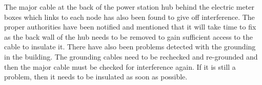\documentclass[a4paper,12pt]{article}
\begin{document}
                                                                                                                                                                                                                                                                                                                                                                                                                                                                                                                                                                                                                                                                                                                                                                                                                                                                                                                                                                                                                                                                                                                                                                                                                                                                                                                                                                                                                                                                     The major cable at the back of the power station hub behind the electric meter boxes which links to each node has also been found to give off interference. The proper authorities have been notified and mentioned that it will take time to fix as the back wall of the hub needs to be removed to gain sufficient access to the cable to insulate it. There have also been problems detected with the grounding in the building. The grounding cables need to be rechecked and re-grounded and then the major cable must be checked for interference again. If it is still a problem, then it needs to be insulated as soon as possible.
\end{document}
